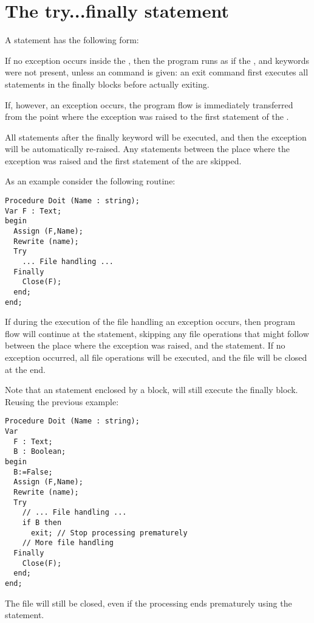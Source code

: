 \section{The try...finally statement}
 

A  statement has the following form:

If no exception occurs inside the , then the program
runs as if the ,  and  keywords were not
present, unless an  command is given: an exit command first
executes all statements in the finally blocks before actually exiting.

If, however, an exception occurs, the program flow is immediately
transferred from the point where the exception was raised to the first
statement of the .

All statements after the finally keyword will be executed, and then
the exception will be automatically re-raised. Any statements between the
place where the exception was raised and the first statement of the
 are skipped.

As an example consider the following routine:
\begin{verbatim}
Procedure Doit (Name : string);
Var F : Text;
begin
  Assign (F,Name);
  Rewrite (name);
  Try
    ... File handling ...
  Finally
    Close(F);
  end;
end;
\end{verbatim}
If during the execution of the file handling an exception occurs, then
program flow will continue at the  statement, skipping any
file operations that might follow between the place where the exception
was raised, and the  statement.
If no exception occurred, all file operations will be executed, and the file
will be closed at the end.

Note that an  statement enclosed by a  block,
will still execute the finally block. Reusing the previous example:
\begin{verbatim}
Procedure Doit (Name : string);
Var
  F : Text;
  B : Boolean;
begin
  B:=False;
  Assign (F,Name);
  Rewrite (name);
  Try
    // ... File handling ...
    if B then
      exit; // Stop processing prematurely
    // More file handling
  Finally
    Close(F);
  end;
end;
\end{verbatim}
The file will still be closed, even if the processing ends prematurely using
the  statement.

